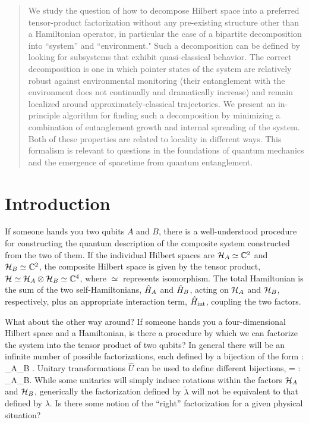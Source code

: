 \documentclass[aps,pra,onecolumn,nofootinbib,12pt,tightenlines]{revtex4-1}
\begin{document}
\newcommand{\sean}[1]{\textbf{\color{red}{#1}}}
\newcommand{\ashmeet}[1]{\textbf{\color{blue}{#1}}}
\newcommand{\todo}[1]{\textbf{\color{orange}{#1}}}
\begin{abstract}
We study the question of how to decompose Hilbert space into a preferred tensor-product factorization without any pre-existing structure other than a Hamiltonian operator, in particular the case of a bipartite decomposition into ``system'' and ``environment."
Such a decomposition can be defined by looking for subsystems that exhibit quasi-classical behavior.
The correct decomposition is one in which pointer states of the system are relatively robust against environmental monitoring (their entanglement with the environment does not continually and dramatically increase) and remain localized around approximately-classical trajectories. 
We present an in-principle algorithm for finding such a decomposition by minimizing a combination of entanglement growth and internal spreading of the system.
Both of these properties are related to locality in different ways.
This formalism is relevant to questions in the foundations of quantum mechanics and the emergence of spacetime from quantum entanglement.
\end{abstract}
\maketitle
\newpage
\tableofcontents
\newpage
\section{Introduction}

If someone hands you two qubits $A$ and $B$, there is a well-understood procedure for constructing the quantum description of the composite system constructed from the two of them.
If the individual Hilbert spaces are $\mathcal{H}_A\simeq \mathbb{C}^2$ and $\mathcal{H}_B\simeq \mathbb{C}^2$, the composite Hilbert space is given by the tensor product, $\mathcal{H} \simeq \mathcal{H}_A\otimes \mathcal{H}_B \simeq \mathbb{C}^4$, where $\simeq$ represents isomorphism.
The total Hamiltonian is the sum of the two self-Hamiltonians, $\hat{H}_A$ and $\hat{H}_B$, acting on $\mathcal{H}_A$ and $\mathcal{H}_B$, respectively, plus an appropriate interaction term, $\hat{H}_{\rm{int}}$, coupling the two factors.

What about the other way around?
If someone hands you a four-dimensional Hilbert space and a Hamiltonian, is there a procedure by which we can factorize the system into the tensor product of two qubits?
In general there will be an infinite number of possible factorizations, each defined by a bijection of the form 
\be
\lambda : \hs \rightarrow \hs_A\otimes \hs_B .
\ee
Unitary transformations $\hat U$ can be used to define different bijections, 
\be
\tilde\lambda = \lambda \circ {} : \hs \rightarrow \hs_A\otimes \hs_B.
\ee
While some unitaries will simply induce rotations within the factors $\mathcal{H}_A$ and $\mathcal{H}_B$, generically the factorization defined by $\tilde\lambda$ will not be equivalent to that defined by $\lambda$.
Is there some notion of the ``right'' factorization for a given physical situation?
\end{document}
